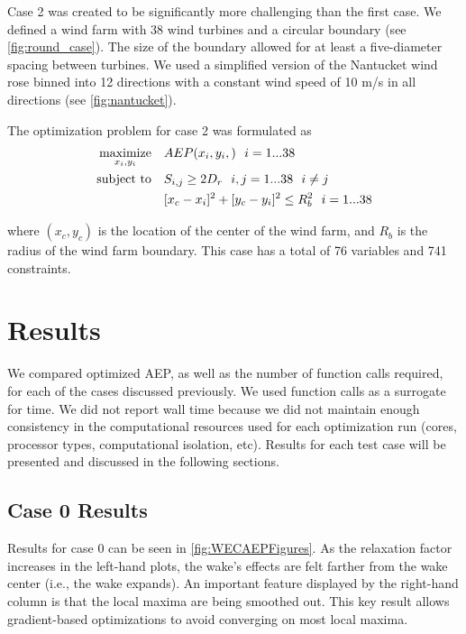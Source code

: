 \documentclass[a4paper]{jpconf}
\begin{document}
  Case 2 was created to be significantly more challenging than the first case. We defined a wind farm with 38 wind turbines and a circular boundary (see \cref{fig:round_case}). The size of the boundary allowed for at least a five-diameter spacing between turbines. We used a simplified version of the Nantucket wind rose binned into 12 directions with a constant wind speed of 10 m/s in all directions (see \cref{fig:nantucket}).


The optimization problem for case 2 was formulated as
%
\begin{equation}
	\label{e:objective}
	\begin{aligned} [b]
	\underset{x_i,y_i}{\textrm{maximize}} \quad & AEP(x_i,y_i,)~~i=1...38\\
	\textrm{subject to} \quad & S_{i,j} \geq 2\*D_{r}~~i,j=1...38~~i \neq j\\
	 & [x_c-x_i]^2+[y_c-y_i]^2 \leq R_{b}^2~~i=1...38\\
	\end{aligned}
\end{equation}
%
where $(x_c,y_c)$ is the location of the center of the wind farm, and $R_b$ is the radius of the wind farm boundary. This case has a total of 76 variables and 741 constraints.

\section{Results}\label{sec:results}
We compared optimized AEP, as well as the number of function calls required, for each of the cases discussed previously. We used function calls as a surrogate for time. We did not report wall time because we did not maintain enough consistency in the computational resources used for each optimization run (cores, processor types, computational isolation, etc). Results for each test case will be presented and discussed in the following sections.

\subsection{Case 0 Results}
Results for case 0 can be seen in \cref{fig:WECAEPFigures}. As the relaxation factor increases in the left-hand plots, the wake's effects are felt farther from the wake center (i.e., the wake expands). An important feature displayed by the right-hand column is that the local maxima are being smoothed out. This key result allows gradient-based optimizations to avoid converging on most local maxima.
\end{document}
